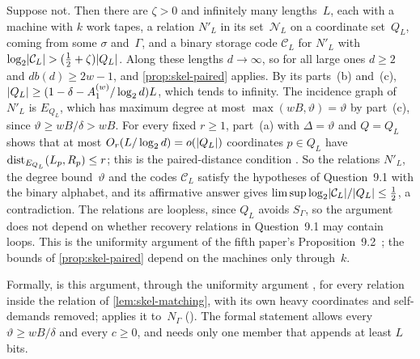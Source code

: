 \begin{outline}
Suppose not. Then there are $\zeta>0$ and infinitely many lengths~$L$, each with a machine with $k$ work tapes, a
relation $N'_L$ in its set~$\mathcal N_L$ on a coordinate set~$Q_L$, coming from some $\sigma$ and~$\Gamma$, and a binary
storage code $\mathcal C_L$ for $N'_L$ with $\log_2\lvert \mathcal C_L \rvert>(\frac12+\zeta)\lvert Q_L \rvert$. Along these lengths
$d\to\infty$, so for all large ones $d\ge2$ and $db(d)\ge2w-1$, and \cref{prop:skel-paired} applies. By its parts~(b)
and~(c), $\lvert Q_L \rvert\ge(1-\delta-A^{(w)}_1/\log_2d)L$, which tends to infinity. The incidence graph of $N'_L$ is $E_{Q_L}$, which
has maximum degree at most $\max(wB,\vartheta)=\vartheta$ by part~(c), since $\vartheta\ge wB/\delta>wB$. For every
fixed $r\ge1$, part~(a) with $\Delta=\vartheta$ and $Q=Q_L$ shows that at most $O_r(L/\log_2d)=o(\lvert Q_L \rvert)$
coordinates $p\in Q_L$ have $\operatorname{dist}_{E_{Q_L}}(L_p,R_p)\le r$; this is the paired-distance condition
\cite[Definition~2.3]{DirectedRecovery2026}. So the relations $N'_L$, the degree bound~$\vartheta$ and the codes
$\mathcal C_L$ satisfy the hypotheses of Question~9.1 with the binary alphabet, and its affirmative answer gives
$\limsup\log_2\lvert \mathcal C_L \rvert/\lvert Q_L \rvert\le\frac12$, a contradiction. The relations are loopless, since $Q_L$ avoids
$S_\Gamma$, so the argument does not depend on whether recovery relations in Question~9.1 may contain loops. This is the
uniformity argument of the fifth paper's Proposition~9.2~\cite{DirectedRecovery2026}; the bounds of
\cref{prop:skel-paired} depend on the machines only through~$k$.

Formally,  is this argument, through the uniformity argument
, for every relation inside the relation  of
\cref{lem:skel-matching}, with its own heavy coordinates and self-demands removed; 
applies it to~$N_\Gamma$ (). The formal statement allows every
$\vartheta\ge wB/\delta$ and every $c\ge0$, and needs only one member that appends at least $L$ bits.
\end{outline}

